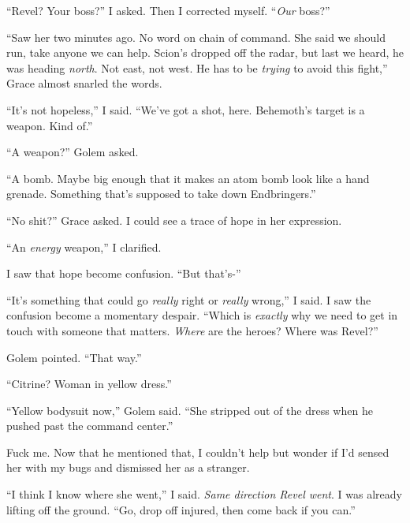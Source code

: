 ``Revel?  Your boss?''  I asked.  Then I corrected myself.  ``\emph{Our }boss?''



``Saw her two minutes ago.  No word on chain of command.  She said we should run, take anyone we can help.  Scion's dropped off the radar, but last we heard, he was heading \emph{north}.  Not east, not west.  He has to be \emph{trying} to avoid this fight,'' Grace almost snarled the words.



``It's not hopeless,'' I said.  ``We've got a shot, here.  Behemoth's target is a weapon.  Kind of.''



``A weapon?'' Golem asked.



``A bomb.  Maybe big enough that it makes an atom bomb look like a hand grenade.  Something that's supposed to take down Endbringers.''



``No shit?''  Grace asked.  I could see a trace of hope in her expression.



``An \emph{energy} weapon,'' I clarified.



I saw that hope become confusion.  ``But that's-''



``It's something that could go \emph{really} right or \emph{really} wrong,'' I said.  I saw the confusion become a momentary despair.  ``Which is \emph{exactly} why we need to get in touch with someone that matters.  \emph{Where} are the heroes?  Where was Revel?''



Golem pointed.  ``That way.''



``Citrine?  Woman in yellow dress.''



``Yellow bodysuit now,'' Golem said.  ``She stripped out of the dress when he pushed past the command center.''



Fuck me.  Now that he mentioned that, I couldn't help but wonder if I'd sensed her with my bugs and dismissed her as a stranger.



``I think I know where she went,'' I said.  \emph{Same direction Revel went}.  I was already lifting off the ground.  ``Go, drop off injured, then come back if you can.''



